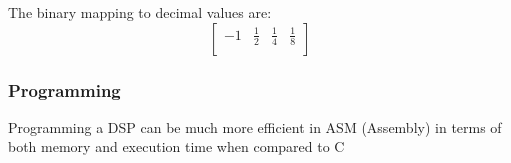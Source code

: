 \noindent The binary mapping to decimal values are:
\begin{equation}
\begin{bmatrix}
    -1 & \frac{1}{2} & \frac{1}{4} & \frac{1}{8}\\
\end{bmatrix}
\end{equation}



\subsubsection{Programming} Programming a DSP can be much more efficient in ASM (Assembly) in terms of
both memory and execution time when compared to C

